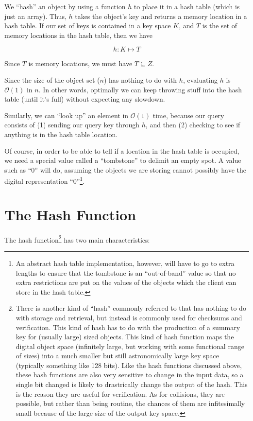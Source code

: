 \documentclass[12pt]{article}
\newcommand{\bigo}{\mathcal{O}}
\begin{document}
We ``hash'' an object by using a function $h$ to place it in a hash table (which is just an array).  Thus, $h$ takes the object's key and returns a memory location in a hash table.  If our set of keys  is contained in a key space $K$, and $T$ is the set of memory locations in the hash table, then we have

$$ h : K \mapsto T $$

Since $T$ is memory locations, we must have $T \subseteq Z$.

Since the size of the object set ($n$) has nothing to do with $h$, evaluating $h$ is $\bigo(1)$ in $n$.  In other words, optimally we can keep throwing stuff into the hash table (until it's full) without expecting any slowdown.  

Similarly, we can ``look up'' an element in $\bigo(1)$ time, because our query consists of (1) sending our query key through $h$, and then (2) checking to see if anything is in the hash table location.  

Of course, in order to be able to tell if a location in the hash table is occupied, we need a special value called a ``tombstone'' to delimit an empty spot.   A value such as ``0'' will do, assuming the objects we are storing cannot possibly have the digital representation ``0''\footnote{An abstract hash table implementation, however, will have to go to extra lengths to ensure that the tombstone is an ``out-of-band'' value so that no extra restrictions are put on the values of the objects which the client can store in the hash table.}.

\section{The Hash Function}

The hash function\footnote{There is another kind of ``hash'' commonly referred to that has nothing to do with storage and retrieval, but instead is commonly used for checksums and verification.  This kind of hash has to do with the production of a summary key for (usually large) sized objects. This kind of hash function maps the digital object space (infinitely large, but working with some functional range of sizes) into a much smaller but still astronomically large key space (typically something like 128 bits).  Like the hash functions discussed above, these hash functions are also very sensitive to change in the input data, so a single bit changed is likely to drastrically change the output of the hash.  This is the reason they are useful for verification. As for collisions, they are possible, but rather than being routine, the chances of them are infitesimally small because of the large size of the output key space.} has two main characteristics:
\end{document}
